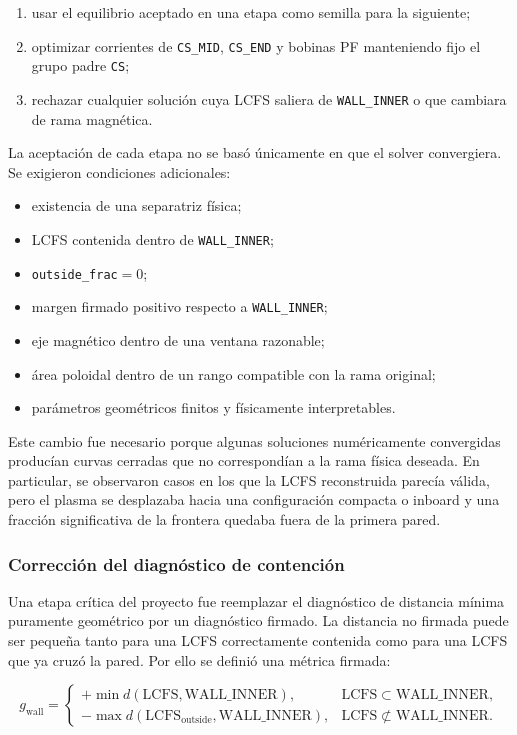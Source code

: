 \documentclass[11pt,a4paper]{article}
\begin{document}
\begin{enumerate}
    \item usar el equilibrio aceptado en una etapa como semilla para la siguiente;
    \item optimizar corrientes de \texttt{CS\_MID}, \texttt{CS\_END} y bobinas PF manteniendo
    fijo el grupo padre \texttt{CS};
    \item rechazar cualquier solución cuya LCFS saliera de \texttt{WALL\_INNER} o que cambiara
    de rama magnética.
\end{enumerate}

La aceptación de cada etapa no se basó únicamente en que el solver convergiera. Se exigieron
condiciones adicionales:

\begin{itemize}
    \item existencia de una separatriz física;
    \item LCFS contenida dentro de \texttt{WALL\_INNER};
    \item \texttt{outside\_frac}$=0$;
    \item margen firmado positivo respecto a \texttt{WALL\_INNER};
    \item eje magnético dentro de una ventana razonable;
    \item área poloidal dentro de un rango compatible con la rama original;
    \item parámetros geométricos finitos y físicamente interpretables.
\end{itemize}

Este cambio fue necesario porque algunas soluciones numéricamente convergidas producían curvas
cerradas que no correspondían a la rama física deseada. En particular, se observaron casos en
los que la LCFS reconstruida parecía válida, pero el plasma se desplazaba hacia una configuración
compacta o inboard y una fracción significativa de la frontera quedaba fuera de la primera pared.

\subsubsection{Corrección del diagnóstico de contención}
Una etapa crítica del proyecto fue reemplazar el diagnóstico de distancia mínima puramente
geométrico por un diagnóstico firmado. La distancia no firmada puede ser pequeña tanto para
una LCFS correctamente contenida como para una LCFS que ya cruzó la pared. Por ello se definió
una métrica firmada:

\[
g_{\mathrm{wall}} =
\begin{cases}
+\min d(\mathrm{LCFS},\mathrm{WALL\_INNER}), & \mathrm{LCFS}\subset \mathrm{WALL\_INNER},\\[2mm]
-\max d(\mathrm{LCFS}_{\mathrm{outside}},\mathrm{WALL\_INNER}), & \mathrm{LCFS}\not\subset \mathrm{WALL\_INNER}.
\end{cases}
\]
\end{document}
